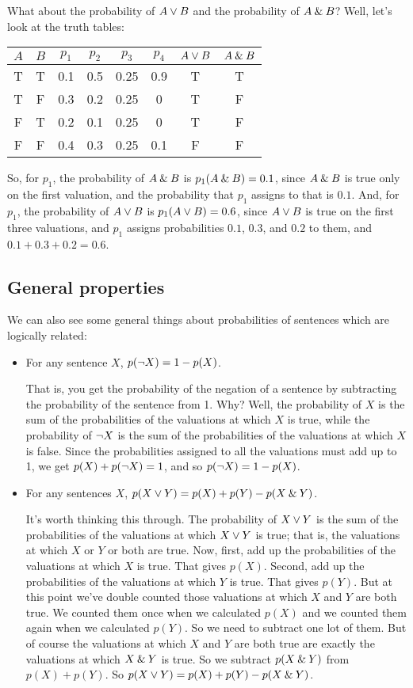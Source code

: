 What about the probability of $A \vee B$ and the probability of $A\mathbin{\&} B$? Well, let's look at the truth tables:
\begin{center}
\begin{tabular}{cc|c|c|c|c|c|c}
$A$ & $B$ & $p_1$ & $p_2$ & $p_3$ & $p_4$ & $A \vee B$ & $A\mathbin{\&} B$ \\
\hline
T & T &  0.1 & 0.5 & 0.25 & 0.9& T & T \\
T & F  & 0.3 & 0.2 & 0.25 & 0 & T & F\\
F & T  & 0.2 & 0.1 & 0.25 & 0 & T & F\\
F & F  & 0.4 & 0.3 & 0.25 & 0.1 & F & F
\end{tabular}
\end{center}
So, for $p_1$, the probability of $A\mathbin{\&} B$ is $p_1(A\mathbin{\&} B) = 0.1$, since $A\mathbin{\&} B$ is true only on the first valuation, and the probability that $p_1$ assigns to that is $0.1$. And, for $p_1$, the probability of $A \vee B$ is $p_1(A \vee B) = 0.6$, since $A \vee B$ is true on the first three valuations, and $p_1$ assigns probabilities $0.1$, $0.3$, and $0.2$ to them, and $0.1 + 0.3 + 0.2 = 0.6$.

\subsection{General properties}
We can also see some general things about probabilities of sentences which are logically related:
\begin{itemize}
\item For any sentence $X$, $p(\neg X) = 1 - p(X)$.

That is, you get the probability of the negation of a sentence by subtracting the probability of the sentence from 1. Why? Well, the probability of $X$ is the sum of the probabilities of the valuations at which $X$ is true, while the probability of $\neg X$ is the sum of the probabilities of the valuations at which $X$ is false. Since the probabilities assigned to all the valuations must add up to 1, we get $p(X) + p(\neg X) = 1$, and so $p(\neg X) = 1 - p(X)$.
\item For any sentences $X$, $p(X \vee Y) = p(X) + p(Y) - p(X\mathbin{\&} Y)$. 

It's worth thinking this through. The probability of $X \vee Y$ is the sum of the probabilities of the valuations at which $X \vee Y$ is true; that is, the valuations at which $X$ or $Y$ or both are true. Now, first, add up the probabilities of the valuations at which $X$ is true. That gives $p(X)$. Second, add up the probabilities of the valuations at which $Y$ is true. That gives $p(Y)$. But at this point we've double counted those valuations at which $X$ and $Y$ are both true. We counted them once when we calculated $p(X)$ and we counted them again when we calculated $p(Y)$. So we need to subtract one lot of them. But of course the valuations at which $X$ and $Y$ are both true are exactly the valuations at which $X\mathbin{\&} Y$ is true. So we subtract $p(X\mathbin{\&} Y)$ from $p(X) + p(Y)$. So $p(X \vee Y) = p(X) + p(Y) - p(X\mathbin{\&} Y)$.
\end{itemize}


